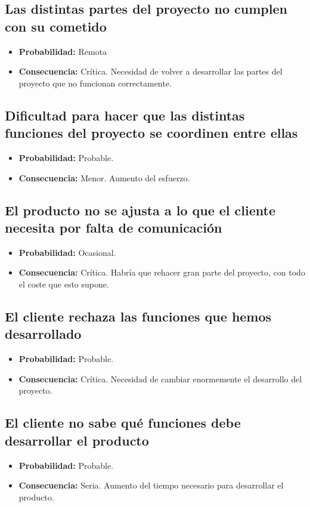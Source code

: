 \documentclass[spanish,a4paper,12pt]{report}	%
\begin{document}
	\subsection*{Las distintas partes del proyecto no cumplen con su cometido}
		\begin{itemize}
			\item \textbf {Probabilidad: }Remota
			\item \textbf {Consecuencia: }Crítica. Necesidad de volver a desarrollar las partes del proyecto que no funcionan correctamente.
		\end{itemize}
	
	\subsection*{Dificultad para hacer que las distintas funciones del proyecto se coordinen entre ellas}
		\begin{itemize}
			\item \textbf {Probabilidad: }Probable.
			\item \textbf {Consecuencia: }Menor. Aumento del esfuerzo.
		\end{itemize}
	
	\subsection*{El producto no se ajusta a lo que el cliente necesita por falta de comunicación}
		\begin{itemize}
			\item \textbf {Probabilidad: }Ocasional.
			\item \textbf {Consecuencia: }Crítica.  Habría que rehacer gran parte del proyecto, con todo el coste que esto supone.
		\end{itemize}
	
	\subsection*{El cliente rechaza las funciones que hemos desarrollado}
		\begin{itemize}
			\item \textbf {Probabilidad: }Probable.
			\item \textbf {Consecuencia: }Crítica. Necesidad de cambiar enormemente el desarrollo del proyecto.
		\end{itemize}
	
	\subsection*{El cliente no sabe qué funciones debe desarrollar el producto}
		\begin{itemize}
			\item \textbf {Probabilidad: }Probable.
			\item \textbf {Consecuencia: }Seria. Aumento del tiempo necesario para desarrollar el producto.
		\end{itemize}
	
\end{document}
